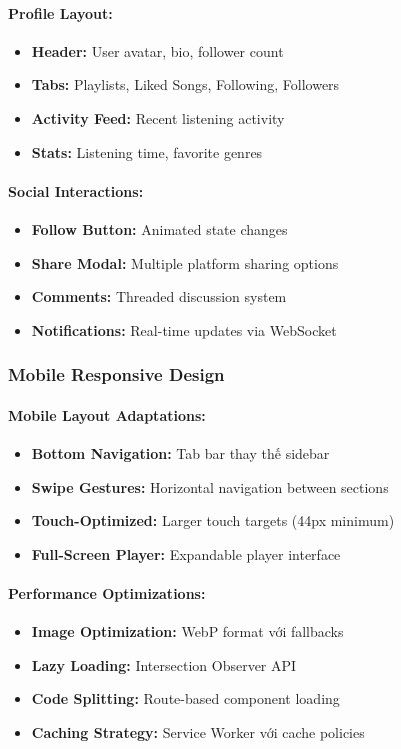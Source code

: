 \paragraph{Profile Layout:}
\begin{itemize}
    \item \textbf{Header:} User avatar, bio, follower count
    \item \textbf{Tabs:} Playlists, Liked Songs, Following, Followers
    \item \textbf{Activity Feed:} Recent listening activity
    \item \textbf{Stats:} Listening time, favorite genres
\end{itemize}

\paragraph{Social Interactions:}
\begin{itemize}
    \item \textbf{Follow Button:} Animated state changes
    \item \textbf{Share Modal:} Multiple platform sharing options
    \item \textbf{Comments:} Threaded discussion system
    \item \textbf{Notifications:} Real-time updates via WebSocket
\end{itemize}

\subsubsection{Mobile Responsive Design}

\paragraph{Mobile Layout Adaptations:}
\begin{itemize}
    \item \textbf{Bottom Navigation:} Tab bar thay thế sidebar
    \item \textbf{Swipe Gestures:} Horizontal navigation between sections
    \item \textbf{Touch-Optimized:} Larger touch targets (44px minimum)
    \item \textbf{Full-Screen Player:} Expandable player interface
\end{itemize}

\paragraph{Performance Optimizations:}
\begin{itemize}
    \item \textbf{Image Optimization:} WebP format với fallbacks
    \item \textbf{Lazy Loading:} Intersection Observer API
    \item \textbf{Code Splitting:} Route-based component loading
    \item \textbf{Caching Strategy:} Service Worker với cache policies
\end{itemize}

